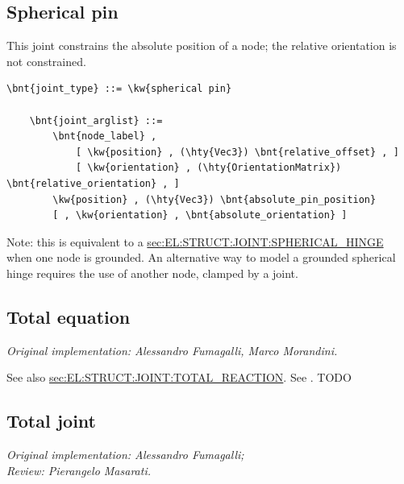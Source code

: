 \subsection{Spherical pin}
This joint constrains the absolute position of a node;
the relative orientation is not constrained.
\begin{Verbatim}[commandchars=\\\{\}]
    \bnt{joint_type} ::= \kw{spherical pin}

    \bnt{joint_arglist} ::=
        \bnt{node_label} ,
            [ \kw{position} , (\hty{Vec3}) \bnt{relative_offset} , ]
            [ \kw{orientation} , (\hty{OrientationMatrix}) \bnt{relative_orientation} , ]
        \kw{position} , (\hty{Vec3}) \bnt{absolute_pin_position}
        [ , \kw{orientation} , \bnt{absolute_orientation} ]   
\end{Verbatim}
Note: this is equivalent to a
\hyperref{\kw{spherical hinge}}{\kw{spherical hinge} (see Section~}{)}{sec:EL:STRUCT:JOINT:SPHERICAL_HINGE}
when one node is grounded.
An alternative way to model a grounded spherical hinge requires
the use of another node, clamped by a  joint.



\subsection{Total equation}
\label{sec:EL:STRUCT:JOINT:TOTAL_EQUATION}
\emph{Original implementation: Alessandro Fumagalli, Marco Morandini.}

See also
\hyperref{\kw{total reaction}}{\kw{total reaction} (see Section~}{)}{sec:EL:STRUCT:JOINT:TOTAL_REACTION}.
See \cite{FUMAGALLI-CND-2011}.
TODO



\subsection{Total joint}
\label{sec:EL:STRUCT:JOINT:TOTAL_JOINT}
\emph{Original implementation: Alessandro Fumagalli; \\
Review: Pierangelo Masarati.}

